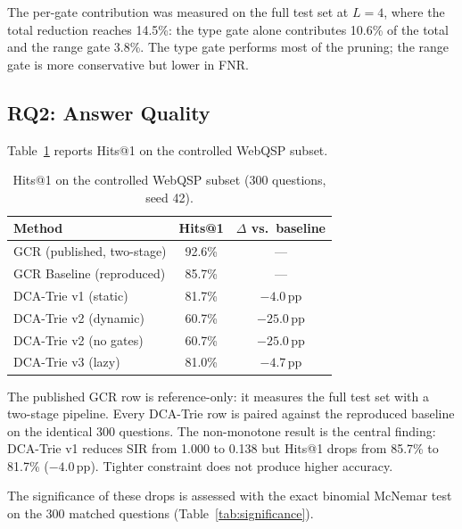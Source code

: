 The per-gate contribution was measured on the full test set at $L{=}4$, where the
total reduction reaches 14.5\%: the type gate alone contributes 10.6\% of the total
and the range gate 3.8\%. The type gate performs most of the pruning; the range gate
is more conservative but lower in FNR.

\subsection{RQ2: Answer Quality}
\label{sec:rq2}

Table~\ref{tab:rq2} reports Hits@1 on the controlled WebQSP subset.

\begin{table}[htpb]
  \centering
  \caption{Hits@1 on the controlled WebQSP subset (300 questions, seed 42).}
  \label{tab:rq2}
  \begin{tabular}{@{}lcc@{}}
    \toprule
    Method                    & Hits@1 & $\Delta$ vs.\ baseline \\
    \midrule
    GCR (published, two-stage) & 92.6\% & ---                   \\
    GCR Baseline (reproduced) & 85.7\% & ---                   \\
    DCA-Trie v1 (static)      & 81.7\% & $-4.0$\,pp            \\
    DCA-Trie v2 (dynamic)     & 60.7\% & $-25.0$\,pp           \\
    DCA-Trie v2 (no gates)    & 60.7\% & $-25.0$\,pp           \\
    DCA-Trie v3 (lazy)        & 81.0\% & $-4.7$\,pp            \\
    \bottomrule
  \end{tabular}
\end{table}

The published GCR row is reference-only: it measures the full test set with a two-stage
pipeline. Every DCA-Trie row is paired against the reproduced baseline on the identical
300 questions. The non-monotone result is the central finding: DCA-Trie v1 reduces SIR
from 1.000 to 0.138 but Hits@1 drops from 85.7\% to 81.7\% ($-4.0$\,pp). Tighter
constraint does not produce higher accuracy.

The significance of these drops is assessed with the exact binomial McNemar test on
the 300 matched questions (Table~\ref{tab:significance}).

